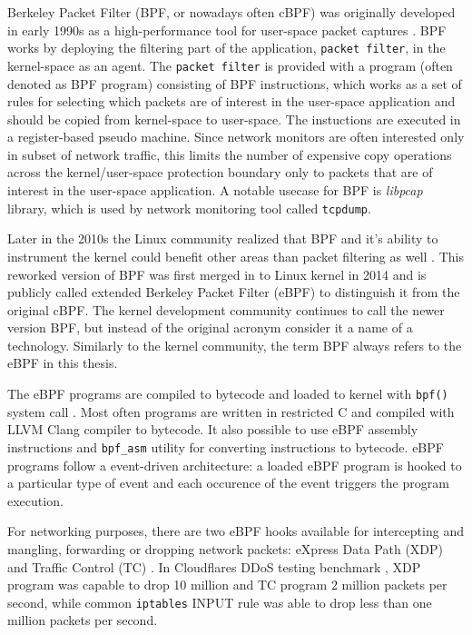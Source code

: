\documentclass[english,12pt,a4paper,pdftex,sci,utf8]{aaltothesis}
\begin{document}
Berkeley Packet Filter (BPF, or nowadays often cBPF) was originally developed in early 1990s as a high-performance tool for user-space packet captures \cite{mccanne1993bsd}. BPF works by deploying the filtering part of the application, \texttt{packet filter}, in the kernel-space as an agent. The \texttt{packet filter} is provided with a program (often denoted as BPF program) consisting of BPF instructions, which works as a set of rules for selecting which packets are of interest in the user-space application and should be copied from kernel-space to user-space. The instuctions are executed in a register-based pseudo machine. Since network monitors are often interested only in subset of network traffic, this limits the number of expensive copy operations across the kernel/user-space protection boundary only to packets that are of interest in the user-space application. A notable usecase for BPF is \textit{libpcap} library, which is used by network monitoring tool called \texttt{tcpdump}.

Later in the 2010s the Linux community realized that BPF and it's ability to instrument the kernel could benefit other areas than packet filtering as well \cite{vieira2020fast}. This reworked version of BPF was first merged in to Linux kernel in 2014 and is publicly called extended Berkeley Packet Filter (eBPF) to distinguish it from the original cBPF. The kernel development community continues to call the newer version BPF, but instead of the original acronym consider it a name of a technology. Similarly to the kernel community, the term BPF always refers to the eBPF in this thesis.

The eBPF programs are compiled to bytecode and loaded to kernel with \texttt{bpf()} system call \cite{miano2021framework}. Most often programs are written in restricted C and compiled with LLVM Clang compiler to bytecode. It also possible to use eBPF assembly instructions and \texttt{bpf\_asm} utility for converting instructions to bytecode. eBPF programs follow a event-driven architecture: a loaded eBPF program is hooked to a particular type of event and each occurence of the event triggers the program execution.

For networking purposes, there are two eBPF hooks available for intercepting and mangling, forwarding or dropping network packets: eXpress Data Path (XDP) and Traffic Control (TC) \cite{miano2021framework}. In Cloudflares DDoS testing benchmark \cite{cloudflare-xdp}, XDP program was capable to drop 10 million and TC program 2 million packets per second, while common \texttt{iptables} INPUT rule was able to drop less than one million packets per second.
\end{document}
